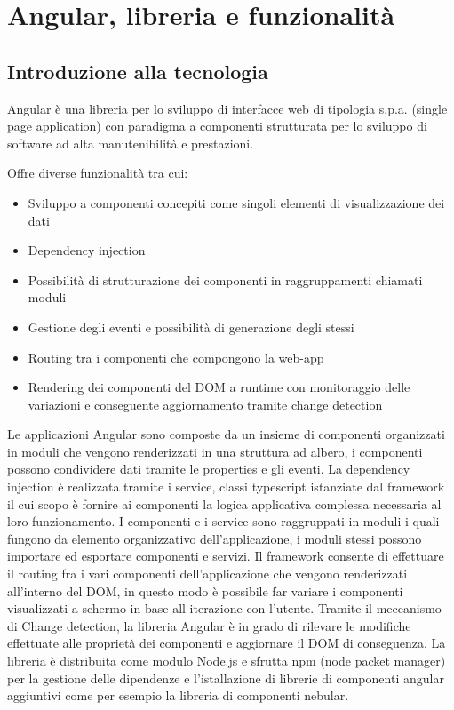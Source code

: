 \chapter{Angular, libreria e funzionalità}
\section{Introduzione alla tecnologia}
Angular è una libreria per lo sviluppo di interfacce web di tipologia s.p.a. (single page application) con paradigma a componenti strutturata per lo sviluppo di software ad alta manutenibilità e prestazioni.

Offre diverse funzionalità tra cui:
\begin{itemize}
    \item Sviluppo a componenti concepiti come singoli elementi di visualizzazione dei dati 
    \item Dependency injection 
    \item Possibilità di strutturazione dei componenti in raggruppamenti chiamati moduli
    \item Gestione degli eventi e possibilità di generazione degli stessi
    \item Routing tra i componenti che compongono la web-app
    \item Rendering dei componenti del DOM a runtime con monitoraggio delle variazioni e conseguente aggiornamento tramite change detection
\end{itemize} 
Le applicazioni Angular sono composte da un insieme di componenti organizzati in moduli che vengono renderizzati in una struttura ad albero, i componenti possono condividere dati tramite le properties e gli eventi.
\newline
\newline
La dependency injection è realizzata tramite i service, classi typescript istanziate dal framework il cui scopo è fornire ai componenti la logica applicativa complessa necessaria al loro funzionamento.
\newline
\newline
I componenti e i service sono raggruppati in moduli i quali fungono da elemento organizzativo dell'applicazione, i moduli stessi possono importare ed esportare componenti e servizi.
\newline
\newline
Il framework consente di effettuare il routing fra i vari componenti dell'applicazione che vengono renderizzati all'interno del DOM, in questo modo è possibile far variare i componenti visualizzati a schermo in base all iterazione con l'utente.
\newline
\newline
Tramite il meccanismo di Change detection, la libreria Angular è in grado di rilevare le modifiche effettuate alle proprietà dei componenti e aggiornare il DOM di conseguenza.
\newline
\newline
La libreria è distribuita come modulo Node.js e sfrutta npm (node packet manager) per la gestione delle dipendenze e l'istallazione di librerie di componenti angular aggiuntivi come per esempio la libreria di componenti nebular.
\newline
\newpage